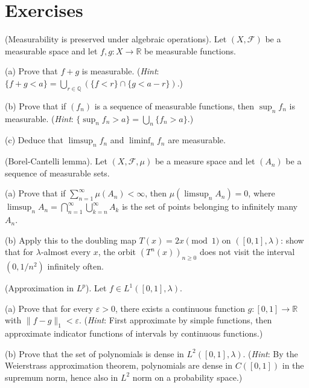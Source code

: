 \bigskip


\section*{Exercises}

\begin{exercise}
(Measurability is preserved under algebraic operations). Let $(X, \mathcal{F})$ be a measurable space and let $f, g: X \to \mathbb{R}$ be measurable functions.

(a) Prove that $f + g$ is measurable. (\textit{Hint}: $\{f + g < a\} = \bigcup_{r \in \mathbb{Q}} (\{f < r\} \cap \{g < a - r\})$.)

(b) Prove that if $(f_n)$ is a sequence of measurable functions, then $\sup_n f_n$ is measurable. (\textit{Hint}: $\{\sup_n f_n > a\} = \bigcup_n \{f_n > a\}$.)

(c) Deduce that $\limsup_n f_n$ and $\liminf_n f_n$ are measurable.
\end{exercise}


\begin{exercise}
(Borel-Cantelli lemma). Let $(X, \mathcal{F}, \mu)$ be a measure space and let $(A_n)$ be a sequence of measurable sets.

(a) Prove that if $\sum_{n=1}^{\infty} \mu(A_n) < \infty$, then $\mu(\limsup_n A_n) = 0$, where $\limsup_n A_n = \bigcap_{n=1}^{\infty} \bigcup_{k=n}^{\infty} A_k$ is the set of points belonging to infinitely many $A_n$.

(b) Apply this to the doubling map $T(x) = 2x \pmod{1}$ on $([0,1], \lambda)$: show that for $\lambda$-almost every $x$, the orbit $(T^n(x))_{n \geq 0}$ does not visit the interval $(0, 1/n^2)$ infinitely often.
\end{exercise}


\begin{exercise}
(Approximation in $L^p$). Let $f \in L^1([0,1], \lambda)$.

(a) Prove that for every $\varepsilon > 0$, there exists a continuous function $g: [0,1] \to \mathbb{R}$ with $\|f - g\|_1 < \varepsilon$. (\textit{Hint}: First approximate by simple functions, then approximate indicator functions of intervals by continuous functions.)

(b) Prove that the set of polynomials is dense in $L^2([0,1], \lambda)$. (\textit{Hint}: By the Weierstrass approximation theorem, polynomials are dense in $C([0,1])$ in the supremum norm, hence also in $L^2$ norm on a probability space.)
\end{exercise}


